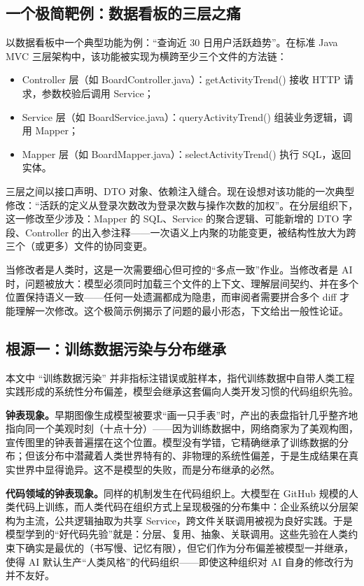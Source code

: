 \documentclass[11pt,a4paper]{ctexart}
\begin{document}
\subsection{一个极简靶例：数据看板的三层之痛}
以数据看板中一个典型功能为例：“查询近 30 日用户活跃趋势”。在标准 Java MVC 三层架构中，该功能被实现为横跨至少三个文件的方法链：

\begin{itemize}
\item Controller 层（如 BoardController.java）：getActivityTrend() 接收 HTTP 请求，参数校验后调用 Service；
\item Service 层（如 BoardService.java）：queryActivityTrend() 组装业务逻辑，调用 Mapper；
\item Mapper 层（如 BoardMapper.java）：selectActivityTrend() 执行 SQL，返回实体。
\end{itemize}

三层之间以接口声明、DTO 对象、依赖注入缝合。现在设想对该功能的一次典型修改：“活跃的定义从登录次数改为登录次数与操作次数的加权”。在分层组织下，这一修改至少涉及：Mapper 的 SQL、Service 的聚合逻辑、可能新增的 DTO 字段、Controller 的出入参注释——一次语义上内聚的功能变更，被结构性放大为跨三个（或更多）文件的协同变更。

当修改者是人类时，这是一次需要细心但可控的“多点一致”作业。当修改者是 AI 时，问题被放大：模型必须同时加载三个文件的上下文、理解层间契约、并在多个位置保持语义一致——任何一处遗漏都成为隐患，而审阅者需要拼合多个 diff 才能理解一次修改。这个极简示例揭示了问题的最小形态，下文给出一般性论证。

\subsection{根源一：训练数据污染与分布继承}
本文中 “训练数据污染” 并非指标注错误或脏样本，指代训练数据中自带人类工程实践形成的系统性分布偏差，模型会继承这套偏向人类开发习惯的代码组织先验。

\textbf{钟表现象。}早期图像生成模型被要求“画一只手表”时，产出的表盘指针几乎整齐地指向同一个美观时刻（十点十分）——因为训练数据中，网络商家为了美观构图，宣传图里的钟表普遍摆在这个位置。模型没有学错，它精确继承了训练数据的分布；但该分布中潜藏着人类世界特有的、非物理的系统性偏差，于是生成结果在真实世界中显得诡异。这不是模型的失败，而是分布继承的必然。

\textbf{代码领域的钟表现象。}同样的机制发生在代码组织上。大模型在 GitHub 规模的人类代码上训练\cite{ref10}，而人类代码在组织方式上呈现极强的分布集中：企业系统以分层架构为主流，公共逻辑抽取为共享 Service，跨文件关联调用被视为良好实践。于是模型学到的“好代码先验”就是：分层、复用、抽象、关联调用。这些先验在人类约束下确实是最优的（书写慢、记忆有限），但它们作为分布偏差被模型一并继承，使得 AI 默认生产“人类风格”的代码组织——即使这种组织对 AI 自身的修改行为并不友好。
\end{document}
